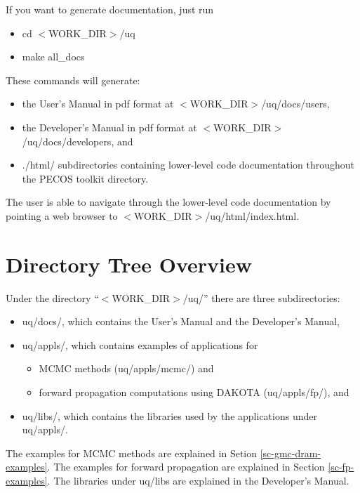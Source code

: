 If you want to generate documentation, just run
\begin{itemize}
\item cd $<$WORK\_DIR$>$/uq
\item make all\_docs
\end{itemize}
These commands will generate:
\begin{itemize}
\item the User's Manual in pdf format at $<$WORK\_DIR$>$/uq/docs/users,
\item the Developer's Manual in pdf format at $<$WORK\_DIR$>$/uq/docs/developers, and
\item ./html/ subdirectories containing lower-level code documentation throughout the PECOS toolkit directory.
\end{itemize}
The user is able to navigate through the lower-level code documentation by pointing a web browser to $<$WORK\_DIR$>$/uq/html/index.html.

\section{Directory Tree Overview}

Under the directory ``$<$WORK\_DIR$>$/uq/'' there are three subdirectories:
\begin{itemize}
\item uq/docs/, which contains the User's Manual and the Developer's Manual,
\item {uq/appls/, which contains examples of applications for
\begin{itemize}
\item MCMC methods (uq/appls/mcmc/) and
\item forward propagation computations using DAKOTA (uq/appls/fp/), and
\end{itemize}
}
\item uq/libs/, which contains the libraries used by the applications under uq/appls/.
\end{itemize}

The examples for MCMC methods are explained in Setion \ref{sc-gmc-dram-examples}.
The examples for forward propagation are explained in Section \ref{sc-fp-examples}.
The libraries under uq/libs are explained in the Developer's Manual.
